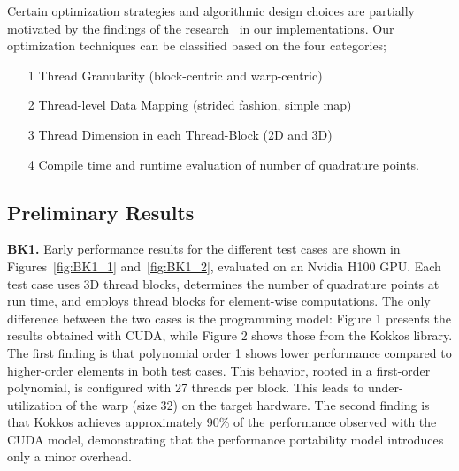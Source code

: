 \documentclass[a4paper,12pt]{article}
\begin{document}
Certain optimization strategies and algorithmic design choices are partially motivated by the findings of the research~\cite{Swiry2019} in our implementations. Our optimization techniques can be classified based on the four categories;
\begin{itemize}
\item[1] Thread Granularity (block-centric and warp-centric)
\item [2] Thread-level Data Mapping (strided fashion, simple map)
\item[3] Thread Dimension in each Thread-Block (2D and 3D)
\item[4] Compile time and runtime evaluation of number of quadrature points.
\end{itemize}

\subsection{Preliminary Results}

{\bf BK1.} Early performance results for the different test cases are shown in Figures~\ref{fig:BK1_1} and~\ref{fig:BK1_2}, evaluated on an Nvidia H100 GPU. Each test case uses 3D thread blocks, determines the number of quadrature points at run time, and employs thread blocks for element-wise computations. The only difference between the two cases is the programming model: Figure 1 presents the results obtained with CUDA, while Figure 2 shows those from the Kokkos library.
The first finding is that polynomial order 1 shows lower performance compared to higher-order elements in both test cases. This behavior, rooted in a first-order polynomial, is configured with 27 threads per block. This leads to under-utilization of the warp (size 32) on the target hardware.
The second finding is that Kokkos achieves approximately 90\% of the performance observed with the CUDA model, demonstrating that the performance portability model introduces only a minor overhead.
\end{document}
